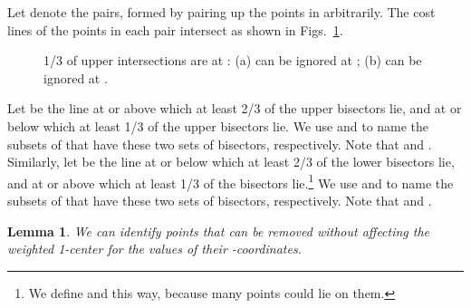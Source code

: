 \documentclass[preprint,10pt]{elsarticle}
\newtheorem{lemma}{Lemma}
\begin{document}
Let  denote the  pairs,
formed by pairing up the points in  arbitrarily.
The cost lines of the points in each pair  intersect
as shown in Figs.~\ref{fig:2points1}.
\begin{figure}[h]
\centering
{}
\hspace{2mm}
\caption{1/3 of upper intersections are at :
(a)  can be ignored at ; (b)  can be ignored at .
}
\label{fig:2points1}
\end{figure}
Let  be the line at or above which at least 2/3 of the upper bisectors lie,
and at or below which at least 1/3 of the upper bisectors lie.
We use  and  to name the subsets of
  that have these two sets of bisectors, respectively.
 Note that  and .
Similarly, let   be the line at or below which at least 2/3 of the  
lower bisectors lie,
and  at or above which at least 1/3 of the bisectors lie.\footnote{{We define  and  this way,
because many points could lie on them.}}
We use  and  to name the subsets of
 that have these two sets of bisectors, respectively.
 Note that  and .
\begin{lemma} \label{lem:one6th}
We can identify  points that can be removed without affecting the weighted 1-center
 for the values
of their -coordinates.
\end{lemma}
\end{document}
